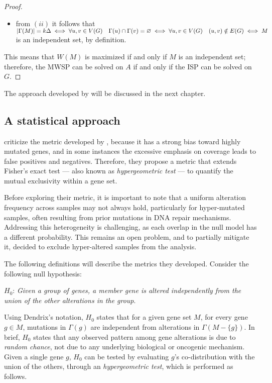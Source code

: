 \begin{proof}
\begin{itemize}
        \item from $(ii)$ it follows that $\left|\Gamma(M)\right| = k \Delta \iff \forall u, v \in V(G) \quad \Gamma(u) \cap \Gamma(v) = \varnothing \iff \forall u, v \in V(G) \quad (u, v) \notin E(G) \iff M$ is an independent set, by definition.
    \end{itemize}

    This means that $W(M)$ is maximized if and only if $M$ is an independent set; therefore, the MWSP can be solved on $A$ if and only if the ISP can be solved on $G$.
\end{proof}

The approach developed by \textcite{dendrix} will be discussed in the next chapter.

\subsection{A statistical approach}

\textcite{mutex} criticize the metric developed by \textcite{dendrix}, because it has a strong bias toward highly mutated genes, and in some instances the excessive emphasis on coverage leads to false positives and negatives. Therefore, they propose a metric that extends Fisher's exact test --- also known as \textit{hypergeometric test} --- to quantify the mutual exclusivity within a gene set.

Before exploring their metric, it is important to note that a uniform alteration frequency across samples may not always hold, particularly for hyper-mutated samples, often resulting from prior mutations in DNA repair mechanisms. Addressing this heterogeneity is challenging, as each overlap in the null model has a different probability. This remains an open problem, and to partially mitigate it, \textcite{mutex} decided to exclude hyper-altered samples from the analysis.

The following definitions will describe the metrics they developed. Consider the following null hypothesis:

\begin{displayquote}
    $H_0$: \textit{Given a group of genes, a member gene is altered independently from the union of the other alterations in the group}.
\end{displayquote}

Using Dendrix's notation, $H_0$ states that for a given gene set $M$, for every gene $g \in M$, mutations in $\Gamma(g)$ are independent from alterations in $\Gamma(M - \{g\})$. In brief, $H_0$ states that any observed pattern among gene alterations is due to \textit{random chance}, not due to any underlying biological or oncogenic mechanism. Given a single gene $g$, $H_0$ can be tested by evaluating $g$'s co-distribution with the union of the others, through an \textit{hypergeometric test}, which is performed as follows.

